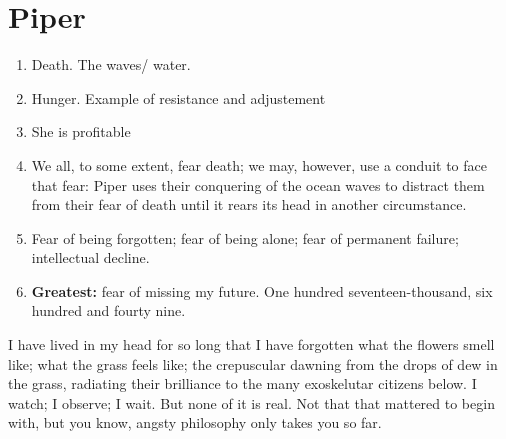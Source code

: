 \documentclass{article}
\begin{document}

\section{Piper}


\begin{enumerate}
  \item Death. The waves/ water. 
  \item Hunger. Example of resistance and adjustement
  \item She is profitable
  \item We all, to some extent, fear death; we may, however, use a conduit to face that fear: Piper uses their conquering of the ocean waves to distract them from their fear of death until it rears its head in another circumstance. 
  \item Fear of being forgotten; fear of being alone; fear of permanent failure; intellectual decline. 
  \item \textbf{Greatest:} fear of missing my future. One hundred seventeen-thousand, six hundred and fourty nine. 
\end{enumerate}

I have lived in my head for so long that I have forgotten what the flowers smell like; what the grass feels like; the crepuscular dawning from the drops of dew in the grass, radiating their brilliance to the many exoskelutar citizens below. I watch; I observe; I wait. But none of it is real. Not that that mattered to begin with, but you know, angsty philosophy only takes you so far. 
\end{document}
